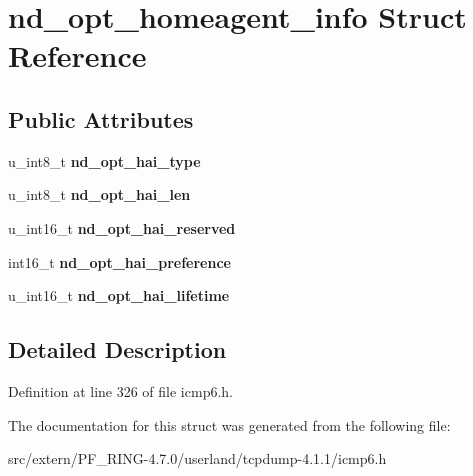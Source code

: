 \hypertarget{structnd__opt__homeagent__info}{
\section{nd\_\-opt\_\-homeagent\_\-info Struct Reference}
\label{structnd__opt__homeagent__info}
}
\subsection*{Public Attributes}
\begin{DoxyCompactItemize}
\item 
\hypertarget{structnd__opt__homeagent__info_a79cb427d870bff931bfbf37925c488ae}{
u\_\-int8\_\-t {\bfseries nd\_\-opt\_\-hai\_\-type}}
\label{structnd__opt__homeagent__info_a79cb427d870bff931bfbf37925c488ae}

\item 
\hypertarget{structnd__opt__homeagent__info_a2f2ea3f07c30cf3cc6d4a478c9f166e9}{
u\_\-int8\_\-t {\bfseries nd\_\-opt\_\-hai\_\-len}}
\label{structnd__opt__homeagent__info_a2f2ea3f07c30cf3cc6d4a478c9f166e9}

\item 
\hypertarget{structnd__opt__homeagent__info_a23196d120fe8e13c5730edad673fdb28}{
u\_\-int16\_\-t {\bfseries nd\_\-opt\_\-hai\_\-reserved}}
\label{structnd__opt__homeagent__info_a23196d120fe8e13c5730edad673fdb28}

\item 
\hypertarget{structnd__opt__homeagent__info_a9e72960c9b0467c8b762208cf242295e}{
int16\_\-t {\bfseries nd\_\-opt\_\-hai\_\-preference}}
\label{structnd__opt__homeagent__info_a9e72960c9b0467c8b762208cf242295e}

\item 
\hypertarget{structnd__opt__homeagent__info_a45393ed35818a5bbc4cbe949da2c6a08}{
u\_\-int16\_\-t {\bfseries nd\_\-opt\_\-hai\_\-lifetime}}
\label{structnd__opt__homeagent__info_a45393ed35818a5bbc4cbe949da2c6a08}

\end{DoxyCompactItemize}


\subsection{Detailed Description}


Definition at line 326 of file icmp6.h.



The documentation for this struct was generated from the following file:\begin{DoxyCompactItemize}
\item 
src/extern/PF\_\-RING-\/4.7.0/userland/tcpdump-\/4.1.1/icmp6.h\end{DoxyCompactItemize}
